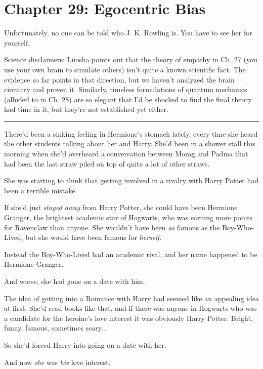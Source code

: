 \chapter{Chapter 29: Egocentric Bias}
Unfortunately, no one can be told who J. K. Rowling is. You have to see her for yourself.

Science disclaimers: Luosha points out that the theory of empathy in Ch. 27 (you use your own brain to simulate others) isn't quite a known scientific fact. The evidence so far points in that direction, but we haven't analyzed the brain circuitry and proven it. Similarly, timeless formulations of quantum mechanics (alluded to in Ch. 28) are so elegant that I'd be shocked to find the final theory had time in it, but they're not established yet either.

\begin{center}\rule{3in}{0.4pt}\end{center}

There'd been a sinking feeling in Hermione's stomach lately, every time she heard the other students talking about her and Harry. She'd been in a shower stall this morning when she'd overheard a conversation between Morag and Padma that had been the last straw piled on top of quite a lot of other straws.

She was starting to think that getting involved in a rivalry with Harry Potter had been a terrible mistake.

If she'd just \emph{stayed away} from Harry Potter, she could have been Hermione Granger, the brightest academic star of Hogwarts, who was earning more points for Ravenclaw than anyone. She wouldn't have been \emph{as} famous as the Boy-Who-Lived, but she would have been famous for \emph{herself}.

Instead the Boy-Who-Lived had an academic rival, and her name happened to be Hermione Granger.

And worse, she had gone on a date with him.

The idea of getting into a Romance with Harry had seemed like an appealing idea at first. She'd read books like that, and if there was anyone in Hogwarts who was a candidate for the heroine's love interest it was obviously Harry Potter. Bright, funny, famous, sometimes scary...

So she'd forced Harry into going on a date with her.

And now \emph{she} was \emph{his} love interest.

